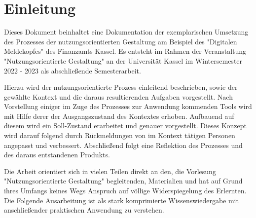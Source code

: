 \chapter{Einleitung}\label{ch:einleitung}

Dieses Dokument beinhaltet eine Dokumentation der exemplarischen Umsetzung des Prozesses der nutzungsorientierten Gestaltung am Beispiel des "Digitalen Meldekopfes" des Finanzamts Kassel. 
Es entsteht im Rahmen der Veranstaltung "Nutzungsorientierte Gestaltung" an der Universität Kassel im Wintersemester 2022 - 2023 als abschließende Semesterarbeit.

Hierzu wird der nutzungsorientierte Prozess einleitend beschrieben, sowie der gewählte Kontext und die daraus resultierenden Aufgaben vorgestellt.
Nach Vorstellung einiger im Zuge des Prozesses zur Anwendung kommenden Tools wird mit Hilfe derer der Ausgangszustand des Kontextes erhoben.
Aufbauend auf diesem wird ein Soll-Zustand erarbeitet und genauer vorgestellt.
Dieses Konzept wird darauf folgend durch Rückmeldungen von im Kontext tätigen Personen angepasst und verbessert.
Abschließend folgt eine Reflektion des Prozesses und des daraus entstandenen Produkts.

Die Arbeit orientiert sich in vielen Teilen direkt an den, die Vorlesung "Nutzungsorientierte Gestaltung" begleitenden, Materialien \cite{NOG} und hat auf Grund ihres Umfangs keines Wegs Anspruch auf völlige Widerspiegelung des Erlernten.
Die Folgende Ausarbeitung ist als stark komprimierte Wissenswiedergabe mit anschließender praktischen Anwendung zu verstehen.

